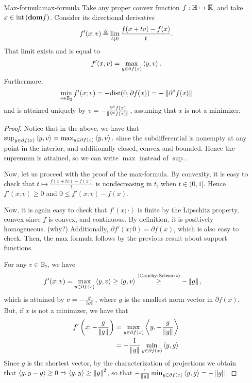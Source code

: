 \begin{ctheorem}{Max-formula}{max-formula}
	Take any proper convex function $f: \mathbb{H} \mapsto \overline{\mathbb{R}}$, and take
	$x \in \mathrm{int}\left( \textbf{dom} f \right)$. Consider its directional derivative
	\[
		f'(x; v) \triangleq \lim_{t \downarrow 0} \frac{f(x + tv) - f(x)}{t}.
	\]
	That limit exists and is equal to
	\[
		f'(x; v) = \max_{y \in \partial f(x)} \left\langle y, v \right\rangle.
	\]
	Furthermore, \[ \min_{v \in \mathbb{B}_2} f'(x; v) = -\mathrm{dist}(0,
	\partial f(x)) = - \left \| \partial^{\circ} f(x) \right \| \] and is attained uniquely
	by $v = -\frac{\partial^{\circ} f(x)}{\left \| \partial^{\circ} f(x) \right \|}$,
	assuming that $x$ is not a minimizer.
\end{ctheorem}
\begin{proof}
	Notice that in the above, we have that
	\( \sup_{y \in \partial f(x)} \left\langle y, v \right\rangle = \max_{y \in \partial f(x)} \left\langle y,
	v \right\rangle, \) since the subdifferential is nonempty at any point in the interior,
	and additionally closed, convex and bounded. Hence the supremum is
	attained, so we can write $\max$ instead of $\sup$.

	Now, let us proceed with the proof of the max-formula. By convexity, it is easy
	to check that $t \mapsto \frac{f(x + tv) - f(x)}{t}$ is nondecreasing in
	$t$, when $t \in (0, 1]$. Hence $f'(x; v) \geq 0$ and $0 \leq f'(x; v) -
	f(x)$.

	Now, it is again easy to check that $f'(x; \cdot)$ is finite by the
	Lipschitz property, convex since $f$ is convex, and continuous. By
	definition, it is positively homogeneous. (why?)
	Additionally, $\partial f'(x; 0) = \partial f(x)$, which is also easy to
	check. Then, the max formula follows by the previous result about support
	functions.

	For any $v \in \mathbb{B}_2$, we have
	\begin{align*}
		f'(x; v) &= \max_{y \in \partial f(x)} \left\langle y, v \right\rangle \geq \left\langle g, v \right\rangle
			\overset{(\text{Cauchy-Schwarz})}{\geq} - \left \| g \right \|,
	\end{align*}
	which is attained by $v = -\frac{g}{\left \| g \right \|}$, where $g$ is the smallest
	norm vector in $\partial f(x)$. But, if $x$ is not a minimizer, we have
	that
	\begin{align*}
		f'\left(x; -\frac{g}{\left \| g \right \|} \right) &= \max_{y \in \partial f(x)}
			\left\langle y, -\frac{g}{\left \| g \right \|} \right\rangle \\
			&= -\frac{1}{\left \| g \right \|} \min_{y \in \partial f(x)} \left\langle y, g \right\rangle
	\end{align*}
	Since $g$ is the shortest vector, by the characterization of projections we
	obtain that $\left\langle g, y - g \right\rangle \geq 0 \Rightarrow \left\langle g, y \right\rangle \geq \left \| g \right \|^2$,
	so that $-\frac{1}{\left \| g \right \|} \min_{y \in \partial f(x)} \left\langle y, g \right\rangle =
		- \left \| g \right \|$.
\end{proof}
